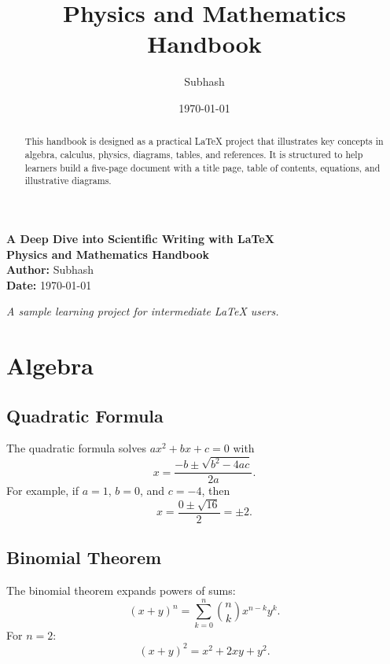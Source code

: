 \documentclass[11pt]{article}
\title{Physics and Mathematics Handbook}
\author{Subhash}
\date{\today}
\begin{document}
\begin{titlepage}
    \centering
    {\large \textbf{A Deep Dive into Scientific Writing with LaTeX}}\\[1.5em]
    {\Huge \textbf{Physics and Mathematics Handbook}}\\[2em]
    {\Large \textbf{Author:} Subhash}\\[1em]
    {\large \textbf{Date:} \today}\\[3em]
    \begin{abstract}
        This handbook is designed as a practical LaTeX project that illustrates key concepts in algebra, calculus, physics, diagrams, tables, and references. It is structured to help learners build a five-page document with a title page, table of contents, equations, and illustrative diagrams.
    \end{abstract}
    \vfill
    \textit{A sample learning project for intermediate LaTeX users.}
\end{titlepage}

\tableofcontents
\newpage

\section{Algebra}
\subsection{Quadratic Formula}
The quadratic formula solves $ax^2 + bx + c = 0$ with
\begin{equation}
    x = \frac{-b \pm \sqrt{b^2 - 4ac}}{2a}.
\end{equation}
For example, if $a = 1$, $b = 0$, and $c = -4$, then
\begin{equation}
    x = \frac{0 \pm \sqrt{16}}{2} = \pm 2.
\end{equation}

\subsection{Binomial Theorem}
The binomial theorem expands powers of sums:
\begin{equation}
    (x + y)^n = \sum_{k=0}^{n} \binom{n}{k} x^{n-k} y^k.
\end{equation}
For $n=2$:
\begin{equation}
    (x+y)^2 = x^2 + 2xy + y^2.
\end{equation}
\end{document}
